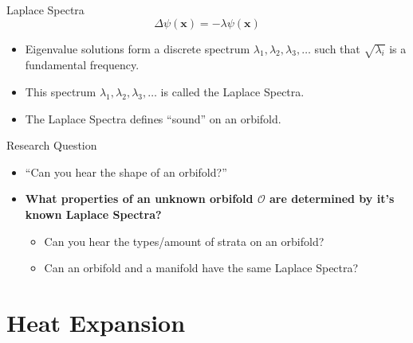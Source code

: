 \documentclass[12pt]{beamer}
\begin{document}
\begin{frame}{Laplace Spectra}
        $$\Delta \psi(\mathbf{x}) = -\lambda \psi(\mathbf{x})$$
    \begin{itemize}
       \item Eigenvalue solutions form a discrete spectrum $\lambda_1, \lambda_2,
           \lambda_3, \dots$ such that $\sqrt{\lambda_i}$ is a fundamental
           frequency. 
       \item This spectrum $\lambda_1, \lambda_2, \lambda_3, \dots$ is
           called the Laplace Spectra.
       \item The Laplace Spectra defines ``sound'' on an orbifold.
    \end{itemize}
\end{frame}
\begin{frame}{Research Question}
    \begin{itemize}
        \item ``Can you hear the shape of an orbifold?''
        \item \textbf{What properties of an unknown orbifold $\mathcal{O}$
            are determined by it's known Laplace Spectra?}
            \begin{itemize}
                \item Can you hear the types/amount of strata on an
                    orbifold?
                \item Can an orbifold and a manifold have the same Laplace
                    Spectra?
            \end{itemize}
    \end{itemize}

\end{frame}

\section{Heat Expansion}
\end{document}
